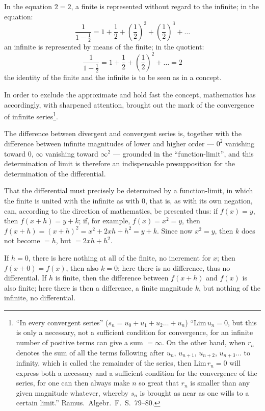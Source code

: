 \documentclass[12pt]{book}
\begin{document}
In the equation $2 = 2$, a finite is represented without regard to the infinite; in
the equation:
\[
\frac{1}{1-\frac{1}{2}} = 1 + \frac{1}{2} + \left(\frac{1}{2}\right)^{2}
+ \left(\frac{1}{2}\right)^{3} + \dots
\]
an infinite is represented by means of the finite; in the quotient:
\[
\frac{1}{1-\frac{1}{2}} = 1 + \frac{1}{2} + \left(\frac{1}{2}\right)^{2}
+ \dots = 2
\]
the identity of the finite and the infinite is to be seen as in a concept.

In order to exclude the approximate and hold fast the concept, mathematics has
accordingly, with sharpened attention, brought out the mark of the convergence of
infinite series\footnote{``In every convergent series'' ($s_n = u_0 + u_1 + u_2 \dots +
u_n$) ``$\mathrm{Lim}\, u_n = 0$, but this is only a necessary, not a sufficient
condition for convergence, for an infinite number of positive terms can give a sum
$= \infty$. On the other hand, when $r_n$ denotes the sum of all the terms following
after $u_n$, $u_{n+1}$, $u_{n+2}$, $u_{n+3} \dots$ to infinity, which is called the
remainder of the series, then $\mathrm{Lim}\, r_n = 0$ will express both a necessary
and a sufficient condition for the convergence of the series, for one can then always
make $n$ so great that $r_n$ is smaller than any given magnitude whatever, whereby
$s_n$ is brought as near as one wills to a certain limit.'' Ramus.\ Algebr.\ F.\ S.\
79--80.}.

The difference between divergent and convergent series is, together with the
difference between infinite magnitudes of lower and higher order --- $0^{2}$ vanishing
toward $0$, $\infty$ vanishing toward $\infty^{2}$ --- grounded in the
``function-limit'', and this determination of limit is therefore an indispensable
presupposition for the determination of the differential.

That the differential must precisely be determined by a function-limit, in which the
finite is united with the infinite
as with $0$, that is, as with its own negation, can, according to the direction of
mathematics, be presented thus: if $f(x) = y$, then $f(x + h) = y + k$; if, for
example, $f(x) = x^{2} = y$, then $f(x + h) = (x + h)^{2} = x^{2} + 2xh + h^{2}
= y + k$. Since now $x^{2} = y$, then $k$ does not become $= h$, but $= 2xh + h^{2}$.

If $h = 0$, there is here nothing at all of the finite, no increment for $x$; then
$f(x + 0) = f(x)$, then also $k = 0$; here there is no difference, thus no
differential. If $h$ is finite, then the difference between $f(x + h)$ and $f(x)$ is
also finite; here there is then a difference, a finite magnitude $k$, but nothing of
the infinite, no differential.
\end{document}

